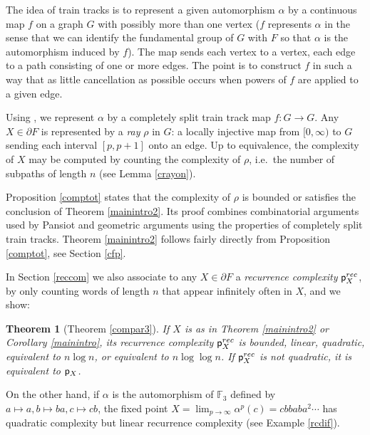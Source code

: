 \documentclass[11pt]{amsart}
\newtheorem{thm}{Theorem}[section]
\theoremstyle{remark}
\newcommand{\pr}{\cp^{rec}}
\newcommand{\cp}{{\sf  p}}
\newcommand {\F} {{\mathbb {F}}}
\newcommand{\bo}{\partial}
\begin{document}
 
 
The idea of  train tracks is to represent a  given   automorphism $\alpha$ by a continuous map $f$ on a graph $G$ with possibly more than one vertex ($f$ represents $\alpha$ in the sense that we can identify the fundamental group of $G$ with $F$ so that  $\alpha$ is the automorphism induced by $f$). The map sends each vertex to a vertex, each edge to a path consisting of one or more edges. The point is to construct   $f$   in such a way that as little cancellation as possible occurs when powers of $f$ are applied to a given edge. 








Using \cite{recogn}, we   represent $\alpha$ by  a completely split train track map $f:G\to G$. Any $X\in\bo F$ is represented by a \emph{ray} $\rho$ in $G$: a locally injective map from $[0,\infty)$ to $G$ sending each interval $[p,p+1]$ onto an edge. 
Up to equivalence, the complexity of $X$ may be computed by counting the  complexity of $\rho$, i.e.\  the number of subpaths   of length $n$   (see Lemma \ref{crayon}).

Proposition \ref{comptot} states that the   complexity of $\rho$   is bounded or satisfies the conclusion of Theorem  \ref{mainintro2}. Its proof  combines combinatorial arguments used by Pansiot and geometric arguments using the properties of completely split train tracks. Theorem    \ref{mainintro2} %
 follows fairly directly from Proposition \ref{comptot},    see Section \ref{cfp}.

In Section \ref{reccom} we  also associate to any $X\in\bo F$ a \emph{recurrence complexity} $\pr_X$, by only counting words of length $n$ that appear infinitely often in $X$, and we  show:


\begin{thm}[Theorem \ref{compar3}]
  If $X$ is as in Theorem  \ref{mainintro2} or   Corollary  \ref{mainintro}, its recurrence complexity $\pr_X$ is bounded,  linear, quadratic, equivalent to $n\log n$, or equivalent to $n\log \log n$.  If $\pr_X$ is not quadratic, it is equivalent to $\cp_X$.
\end{thm}


On the other hand,
if
  $\alpha$ is the automorphism of $\F_3$ defined by $a\mapsto a,b\mapsto  ba,c\mapsto  cb$, the fixed point $X=\lim_{p\to\infty}\alpha^p(c)=cbbaba^2\cdots$   has quadratic complexity but linear recurrence complexity  (see Example \ref{rcdif}). 
  
\end{document}
